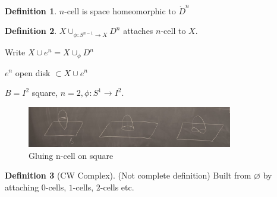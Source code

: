 \documentclass{article}
\theoremstyle{definition}
\newtheorem*{definition}{Definition}
\begin{document}
    \begin{definition}
        \(n\)-cell is space homeomorphic to \(\mathring{D}^n\) 
    \end{definition}

    \begin{definition}
        \(X \cup_{\phi:S^{n-1}\to X} D^n\) attaches \(n\)-cell to \(X\). 
    \end{definition}

    Write \(X \cup e^n = X \cup_{\phi} D^n\)

    \(e^n\) open disk \(\subset X\cup e^n\) 

    \(B = I^2\) square, \(n=2, \phi: S^1 \to I^2\).

    \begin{figure}[H]
        \centering
        \includegraphics[width=0.8\textwidth]{img/ncell}
        \caption{Gluing n-cell on square}
        \label{fig:ncell}
    \end{figure}

    \begin{definition}
        [CW Complex] (Not complete definition) Built from \(\varnothing\) by attaching \(0\)-cells, \(1\)-cells, \(2\)-cells etc.
    \end{definition}
\end{document}
